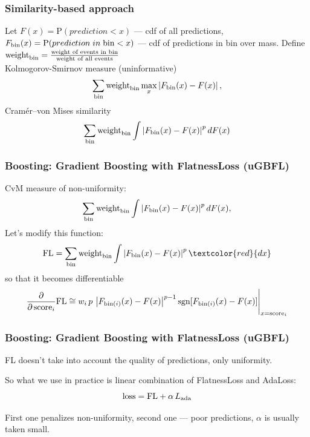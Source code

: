 \documentclass{beamer}
\begin{document}
\begin{frame}[t]
    \frametitle{Similarity-based approach}

    Let $F(x) = \text{P}(prediction < x)$ --- cdf of all predictions, \\
    $F_{\text{bin}}(x) = \text{P}(prediction \; in \; \text{bin} < x)$ --- cdf of predictions in bin over mass. Define $\text{weight}_\text{bin} = \frac{\text{weight of events in bin}}{\text{weight of all events}}$ 
    \bigskip \\


    Kolmogorov-Smirnov measure (uninformative)
    \[
    	\sum_{\text{bin}} \text{weight}_\text{bin} \max_x \left\vert F_{\text{bin}}(x) - F(x)\right\vert,
    \]
    Cram\'er--von Mises similarity
    \[
    	 \sum_{\text{bin}} \text{weight}_\text{bin} \int \left\vert F_{\text{bin}}(x) - F(x)\right\vert^p dF(x)
    \]
\end{frame}

\begin{frame}[t]
    \frametitle{Boosting: Gradient Boosting with FlatnessLoss (uGBFL)}
    CvM measure of non-uniformity:
    \[
        \sum_{\text{bin}} \text{weight}_\text{bin} \int \left\vert F_{\text{bin}}(x) - F(x)\right\vert^p dF(x),
    \]
    Let's modify this function:
    \[
        \FL = \sum_{\bin} \binweight \int \abs{F_{\bin}(x) - F(x)}^p {\textcolor{red}{dx}}
    \]
    so that it becomes differentiable
    \[
        \dfrac{\partial} {\partial \, \text{score}_i} \text{FL}
        \cong 
        w_i \, p \,  \left\vert F_{\text{bin}(i)}(x) - F(x)\right\vert^{p-1}
        \operatorname{sgn}[F_{\text{bin}(i)}(x) - F(x)]
        \Bigg|_{x=\text{score}_i}
    \]
\end{frame}

\begin{frame}
    \frametitle{Boosting: Gradient Boosting with FlatnessLoss (uGBFL)}

    FL doesn't take into account the quality of predictions, only uniformity. 

    So what we use in practice is linear combination of FlatnessLoss and AdaLoss:
    \[
        \text{loss} = \text{FL} + \alpha \, L_\text{ada}
    \]

    First one penalizes non-uniformity, second one --- poor predictions, 
    $\alpha$ is usually taken small.

\end{frame}
\end{document}

